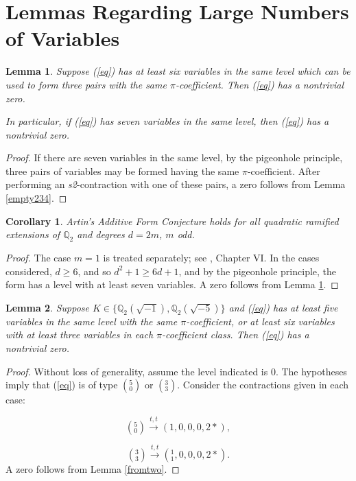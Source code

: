 \documentclass[12pt]{amsart}
\newtheorem{lemma}{Lemma}
\newtheorem{corollary}{Corollary}
\begin{document}
\section{Lemmas Regarding Large Numbers of Variables}

\begin{lemma}\label{max7}
Suppose (\ref{eq}) has at least six variables in the same level  which can be used to form three pairs with the same $\pi$-coefficient. Then (\ref{eq}) has a nontrivial zero.

In particular, if (\ref{eq}) has seven variables in the same level, then (\ref{eq}) has a nontrivial zero.
\end{lemma}
\begin{proof}
If there are seven variables in the same level, by the pigeonhole principle, three pairs of variables may be formed having the same $\pi$-coefficient.  After performing an \textit{s2}-contraction with one of these pairs, a zero follows from Lemma \ref{empty234}.
\end{proof}

\begin{corollary}
Artin's Additive Form Conjecture holds for all quadratic ramified extensions of $\mathbb{Q}_2$ and degrees $d=2m$, $m$ odd.
\end{corollary}
\begin{proof}
The case $m=1$ is treated separately; see \cite{MR2104929}, Chapter VI.  In the cases considered, $d \ge 6$, and so $d^2 + 1 \ge 6d + 1$, and by the pigeonhole principle, the form has a level with at least seven variables.  A zero follows from Lemma \ref{max7}.
\end{proof}

\begin{lemma} \label{fivesame}
Suppose $K \in \{\mathbb{Q}_2(\sqrt{-1}), \mathbb{Q}_2(\sqrt{-5})\}$ and (\ref{eq}) has at least five variables in the same level with the same $\pi$-coefficient, or at least six variables with at least three variables in each $\pi$-coefficient class.  Then (\ref{eq}) has a nontrivial zero.
\end{lemma}
\begin{proof}
Without loss of generality, assume the level indicated is $0$.  The hypotheses imply that (\ref{eq}) is of type $({}^{5}_{0})$ or $({}^{3}_{3})$.  Consider the contractions given in each case:

$$({}^{5}_{0}) \xrightarrow{t, t} (1,0,0,0,2*),$$

$$({}^{3}_{3}) \xrightarrow{t, t} ({}^{1}_{1},0,0,0,2*).$$
A zero follows from Lemma \ref{fromtwo}.
\end{proof}
\end{document}
